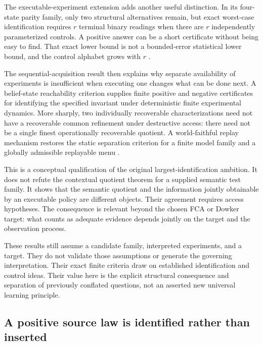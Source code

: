 \documentclass[11pt]{article}
\begin{document}
The executable-experiment extension adds another useful distinction. In its four-state parity family, only two structural alternatives remain, but exact worst-case identification requires $r$ terminal binary readings when there are $r$ independently parameterized controls. A positive answer can be a short certificate without being easy to find. That exact lower bound is not a bounded-error statistical lower bound, and the control alphabet grows with $r$ \cite[the four-state family and Accessible reconstruction versus an inaccessible target]{Evidence}.

The sequential-acquisition result then explains why separate availability of experiments is insufficient when executing one changes what can be done next. A belief-state reachability criterion supplies finite positive and negative certificates for identifying the specified invariant under deterministic finite experimental dynamics. More sharply, two individually recoverable characterizations need not have a recoverable common refinement under destructive access: there need not be a single finest operationally recoverable quotient. A world-faithful replay mechanism restores the static separation criterion for a finite model family and a globally admissible replayable menu \cite[Sequential invariant-identification criterion; Failure of common-refinement closure; Replay restores the static separation criterion]{Evidence}.

This is a conceptual qualification of the original largest-identification ambition. It does not refute the contextual quotient theorem for a supplied semantic test family. It shows that the semantic quotient and the information jointly obtainable by an executable policy are different objects. Their agreement requires access hypotheses. The consequence is relevant beyond the chosen FCA or Dowker target: what counts as adequate evidence depends jointly on the target and the observation process.

These results still assume a candidate family, interpreted experiments, and a target. They do not validate those assumptions or generate the governing interpretation. Their exact finite criteria draw on established identification and control ideas. Their value here is the explicit structural consequence and separation of previously conflated questions, not an asserted new universal learning principle.

\subsection{A positive source law is identified rather than inserted}
\label{sec:two-stage-result}
\end{document}
